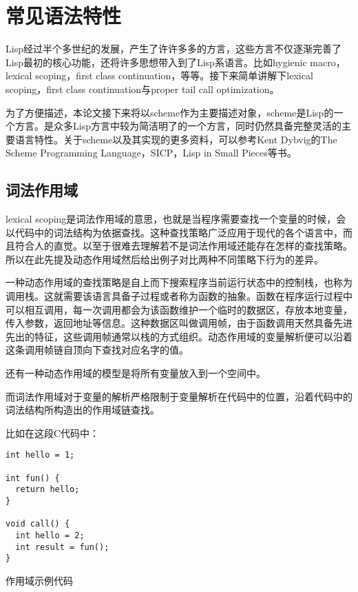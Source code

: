 ﻿%
%

\chapter{常见语法特性}

Lisp经过半个多世纪的发展，产生了许许多多的方言，这些方言不仅逐渐完善了Lisp最初的核心功能，还将许多思想带入到了Lisp系语言。比如hygienic macro，lexical scoping，first class continuation，等等。接下来简单讲解下lexical scoping，first class continuation与proper tail call optimization。

为了方便描述，本论文接下来将以scheme作为主要描述对象，scheme是Lisp的一个方言。是众多Lisp方言中较为简洁明了的一个方言，同时仍然具备完整灵活的主要语言特性。关于scheme以及其实现的更多资料，可以参考Kent Dybvig的The Scheme Programming Language\cite{dybvig09scm}，SICP\cite{sicp}，Lisp in Small Pieces\cite{que03}等书。

\section{词法作用域}

lexical scoping是词法作用域的意思，也就是当程序需要查找一个变量的时候，会以代码中的词法结构为依据查找。这种查找策略广泛应用于现代的各个语言中，而且符合人的直觉。以至于很难去理解若不是词法作用域还能存在怎样的查找策略。所以在此先提及动态作用域然后给出例子对比两种不同策略下行为的差异。

一种动态作用域的查找策略是自上而下搜索程序当前运行状态中的控制栈，也称为调用栈。这就需要该语言具备子过程或者称为函数的抽象。函数在程序运行过程中可以相互调用，每一次调用都会为该函数维护一个临时的数据区，存放本地变量，传入参数，返回地址等信息。这种数据区叫做调用帧，由于函数调用天然具备先进先出的特征，这些调用帧通常以栈的方式组织。动态作用域的变量解析便可以沿着这条调用帧链自顶向下查找对应名字的值。

还有一种动态作用域的模型是将所有变量放入到一个空间中。

而词法作用域对于变量的解析严格限制于变量解析在代码中的位置，沿着代码中的词法结构所构造出的作用域链查找。

比如在这段C代码中：

\begin{code}
\begin{verbatim}
int hello = 1;

int fun() {
  return hello;
}

void call() {
  int hello = 2;
  int result = fun();
}
\end{verbatim}
\caption{作用域示例代码}
\end{code}


